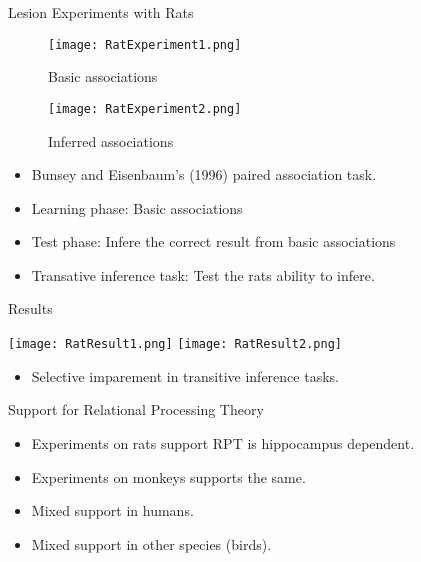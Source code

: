 \documentclass{beamer}
\begin{document}
\begin{frame}{Lesion Experiments with Rats}
		\begin{minipage}{0.4\linewidth}
				\begin{figure}[h!]
				\centering
				\texttt{[image: RatExperiment1.png]}
				\caption*{Basic associations}
				\end{figure}
				\begin{figure}[h!]
				\centering
				\texttt{[image: RatExperiment2.png]}
				\caption*{Inferred associations}
				\end{figure}
		\end{minipage}
		\begin{minipage}{0.5\linewidth}
		\hfill
		\begin{itemize}
			\item
				Bunsey and Eisenbaum's (1996) paired association task.
			\item
				Learning phase: Basic associations
			\item 
				Test phase: Infere the correct result from basic associations
			\item
				Transative inference task: Test the rats ability to infere.
		\end{itemize}
		\end{minipage}
		
\end{frame}

\begin{frame}{Results}
		\begin{minipage}{\linewidth}
				\centering
				\texttt{[image: RatResult1.png]}
				\centering
				\texttt{[image: RatResult2.png]}
		\end{minipage}

		\begin{minipage}{\linewidth}
		\begin{itemize}
			\item
				Selective imparement in transitive inference tasks.
		\end{itemize}
		\end{minipage}
	
\end{frame}

\begin{frame}{Support for Relational Processing Theory}
		\begin{itemize}
	\item
				Experiments on rats support RPT is hippocampus dependent.
		\item
				Experiments on monkeys supports the same.
		\item
				Mixed support in humans.
		\item 
				Mixed support in other species (birds).
		\end{itemize}
\end{frame}
\end{document}

